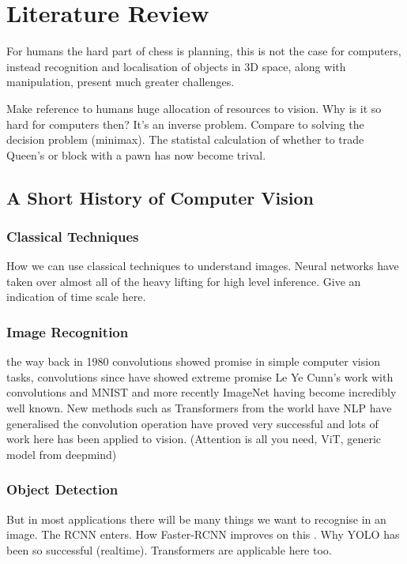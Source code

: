 \section{Literature Review}
\label{research}
For humans the hard part of chess is planning, this is not the case for computers, instead 
recognition and localisation of objects in 3D space, along with manipulation, present much greater
challenges. \cite{}

Make reference to humans huge allocation of resources to vision. \cite{}
Why is it so hard for computers then? It's an inverse problem. 
Compare to solving the decision problem (minimax).  
The statistal calculation of whether to trade Queen's or block with a pawn has now become trival.  

\subsection{A Short History of Computer Vision}
\subsubsection{Classical Techniques}
How we can use classical techniques to understand images.  Neural networks have taken over almost all of the heavy lifting for high level inference.
Give an indication of time scale here.
\subsubsection{Image Recognition}
the way back in 1980 \cite{} convolutions showed promise in simple computer vision tasks, 
convolutions since have showed extreme promise \cite{}
Le Ye Cunn's work with convolutions \cite{} and MNIST \cite{} and more recently ImageNet \cite{} having become incredibly well known.
New methods such as Transformers from the world have NLP have generalised the convolution operation have proved 
very successful and lots of work here has been applied to vision. \cite{} \cite{} \cite{} (Attention is all you need, ViT, generic model from deepmind)
\subsubsection{Object Detection}
But in most applications there will be many things we want to recognise in an image.  The RCNN \cite{} enters.  How Faster-RCNN improves on this \cite{}.
Why YOLO \cite{} has been so successful (realtime).  Transformers are applicable here too.
